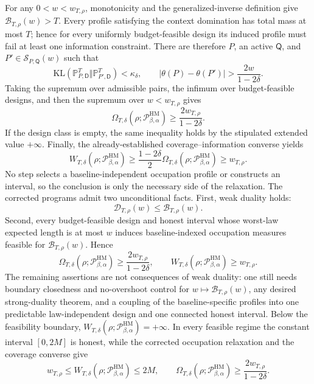 For any \(0<w<w_{T,\rho}\), monotonicity and the generalized-inverse definition give \(\mathcal B_{T,\rho}(w)>T\).  Every profile satisfying the context domination has total mass at most \(T\); hence for every uniformly budget-feasible design its induced profile must fail at least one information constraint.  There are therefore \(P\), an active \(\mathsf Q\), and \(P'\in\mathcal S_{P,\mathsf Q}(w)\) such that
\[
\mathrm{KL}(\mathbb P_{P,\mathsf D}^{T}\Vert\mathbb P_{P',\mathsf D}^{T})<\kappa_\delta,
\qquad
|\theta(P)-\theta(P')|>\frac{2w}{1-2\delta}.
\]
Taking the supremum over admissible pairs, the infimum over budget-feasible designs, and then the supremum over \(w<w_{T,\rho}\) gives
\[
\Omega_{T,\delta}(\rho;\mathcal P_{\beta,\alpha}^{\mathrm{HM}})
\ge\frac{2w_{T,\rho}}{1-2\delta}.
\]
If the design class is empty, the same inequality holds by the stipulated extended value \(+\infty\).  Finally, the already-established coverage--information converse yields
\[
W_{T,\delta}(\rho;\mathcal P_{\beta,\alpha}^{\mathrm{HM}})
\ge\frac{1-2\delta}{2}\Omega_{T,\delta}(\rho;\mathcal P_{\beta,\alpha}^{\mathrm{HM}})
\ge w_{T,\rho}.
\]
No step selects a baseline-independent occupation profile or constructs an interval, so the conclusion is only the necessary side of the relaxation.
The corrected programs admit two unconditional facts.  First, weak duality holds:
\[
\mathcal D_{T,\rho}(w)\le\mathcal B_{T,\rho}(w).
\]
Second, every budget-feasible design and honest interval whose worst-law expected length is at most \(w\) induces baseline-indexed occupation measures feasible for \(\mathcal B_{T,\rho}(w)\).  Hence
\[
\Omega_{T,\delta}(\rho;\mathcal P_{\beta,\alpha}^{\mathrm{HM}})
\ge\frac{2w_{T,\rho}}{1-2\delta},
\qquad
W_{T,\delta}(\rho;\mathcal P_{\beta,\alpha}^{\mathrm{HM}})\ge w_{T,\rho}.
\]
The remaining assertions are not consequences of weak duality: one still needs boundary closedness and no-overshoot control for \(w\mapsto\mathcal B_{T,\rho}(w)\), any desired strong-duality theorem, and a coupling of the baseline-specific profiles into one predictable law-independent design and one connected honest interval.
Below the feasibility boundary, \(W_{T,\delta}(\rho;\mathcal P_{\beta,\alpha}^{\mathrm{HM}})=+\infty\).  In every feasible regime the constant interval \([0,2M]\) is honest, while the corrected occupation relaxation and the coverage converse give
\[
w_{T,\rho}
\le W_{T,\delta}(\rho;\mathcal P_{\beta,\alpha}^{\mathrm{HM}})
\le2M,
\qquad
\Omega_{T,\delta}(\rho;\mathcal P_{\beta,\alpha}^{\mathrm{HM}})
\ge\frac{2w_{T,\rho}}{1-2\delta}.
\]
